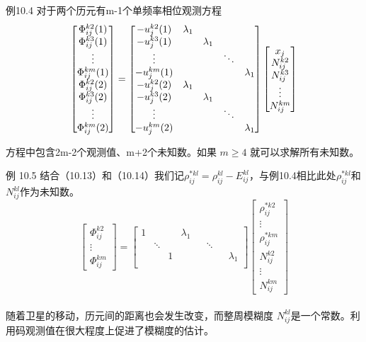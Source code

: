 例10.4 对于两个历元有m-1个单频率相位观测方程
$$
\begin{bmatrix}
\Phi_{ij}^{k2}(1)\\
\Phi_{ij}^{k3}(1)\\
\vdots \\
\Phi_{ij}^{km}(1)\\
\Phi_{ij}^{k2}(2)\\
\Phi_{ij}^{k3}(2)\\
\vdots \\
\Phi_{ij}^{km}(2)
\end{bmatrix}
=\begin{bmatrix}
-u_{j}^{k2}(1)&\lambda_{1}\\
-u_{j}^{k3}(1)&           &\lambda_{1}\\
\vdots     &           &  &\ddots\\
-u_{j}^{km}(1) & &\multicolumn{2}{c}{\raisebox{1.3ex}[0pt]{\Huge}} & \lambda_{1}\\
-u_{j}^{k2}(2)&\lambda_{1}\\
-u_{j}^{k3}(2)&           &\lambda_{1}\\
\vdots     &           &  &\ddots\\
-u_{j}^{km}(2) & &\multicolumn{2}{c}{\raisebox{1.3ex}[0pt]{\Huge}} & \lambda_{1}
\end{bmatrix}
\begin{bmatrix}
x_{j}\\
N_{ij}^{k2}\\
N_{ij}^{k3}\\
\vdots\\
N_{ij}^{km}
\end{bmatrix}
$$

方程中包含2m-2个观测值、m+2个未知数。如果 $m \geq 4$ 就可以求解所有未知数。

例 10.5 结合（10.13）和（10.14）我们记$\rho_{ij}^{*kl}=\rho_{ij}^{kl}-E_{ij}^{kl}$，与例10.4相比此处$\rho_{ij}^{*kl}$和$N_{ij}^{kl}$作为未知数。
$$
\begin{bmatrix}
\Phi_{ij}^{k2}\\
\vdots \\
\Phi_{ij}^{km}
\end{bmatrix}
=\begin{bmatrix}
1&&& \lambda_{1}\\
& \ddots &&&& \ddots\\
& & 1 & & &&&\lambda_{1}\\
\end{bmatrix}
\begin{bmatrix}
\rho_{ij}^{*k2}\\
\vdots\\
\rho_{ij}^{*km}\\
N_{ij}^{k2}\\
\vdots\\
N_{ij}^{km}
\end{bmatrix}
$$\\
随着卫星的移动，历元间的距离也会发生改变，而整周模糊度 $N_{ij}^{kl}$是一个常数。利用码观测值在很大程度上促进了模糊度的估计。


